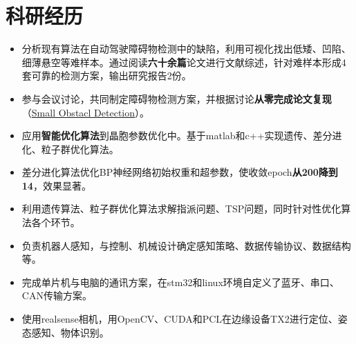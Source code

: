 \documentclass{resume}
\begin{document}

\section{科研经历}
\begin{itemize}
  \item 分析现有算法在自动驾驶障碍物检测中的缺陷，利用可视化找出低矮、凹陷、细薄悬空等难样本。通过阅读\textbf{六十余篇}论文进行文献综述，针对难样本形成4套可靠的检测方案，输出研究报告2份。   
  \item 参与会议讨论，共同制定障碍物检测方案，并根据讨论\textbf{从零完成论文复现}（\href{https://github.com/LT1st/SmallObstacleDetection}{Small Obstacl Detection}）。
\end{itemize}

\begin{itemize}
  \item 应用\textbf{智能优化算法}到晶胞参数优化中。基于matlab和c++实现遗传、差分进化、粒子群优化算法。
  \item 差分进化算法优化BP神经网络初始权重和超参数，使收敛epoch\textbf{从200降到14}，效果显著。
  \item 利用遗传算法、粒子群优化算法求解指派问题、TSP问题，同时针对性优化算法各个环节。
\end{itemize}


\begin{itemize}
  \item 负责机器人感知，与控制、机械设计确定感知策略、数据传输协议、数据结构等。
  \item 完成单片机与电脑的通讯方案，在stm32和linux环境自定义了蓝牙、串口、CAN传输方案。 
  \item 使用realsense相机，用OpenCV、CUDA和PCL在边缘设备TX2进行定位、姿态感知、物体识别。
\end{itemize}

\end{document}
